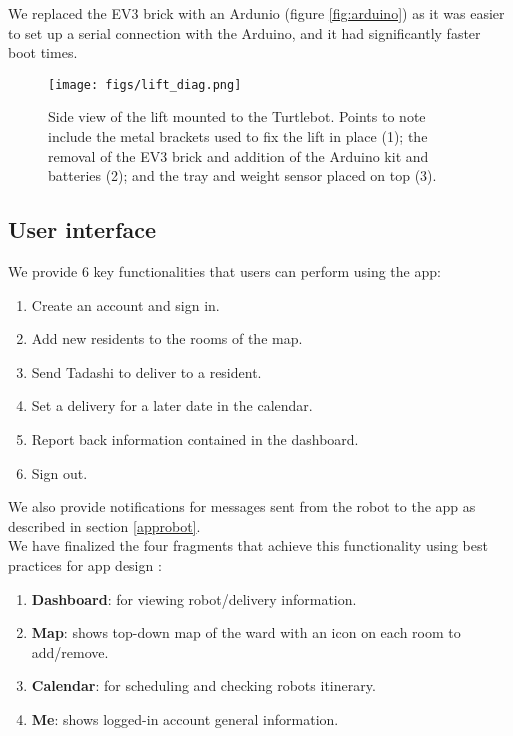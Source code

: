 \documentclass{article}
\begin{document}
We replaced the EV3 brick with an Ardunio (figure \ref{fig:arduino}) as it was easier to set up a serial connection with the Arduino, and it had significantly faster boot times. 


\begin{figure}
  \begin{center}
    \texttt{[image: figs/lift\_diag.png]}
    \caption{Side view of the lift mounted to the Turtlebot. Points to note include the metal brackets used to fix the lift in place (1); the removal of the EV3 brick and addition of the Arduino kit and batteries (2); and the tray and weight sensor placed on top (3).}
  \label{fig:lift}
  \end{center}
\end{figure}

\subsection{User interface}
\label{ui}
We provide 6 key functionalities that users can perform using the app:
\begin{enumerate}
\item Create an account and sign in. 
\item Add new residents to the rooms of the map.
\item Send Tadashi to deliver to a resident. 
\item Set a delivery for a later date in the calendar. 
\item Report back information contained in the dashboard.
\item Sign out.
\end{enumerate}
We also provide notifications for messages sent from the robot to the app as described in section \ref{approbot}.
\\
We have finalized the four fragments that achieve this functionality using best practices for app design \cite{design, ux}:
\begin{enumerate}
  \item {\bf Dashboard}: for viewing robot/delivery information.
  \item {\bf Map}: shows top-down map of the ward with an icon on each room to add/remove. 
  \item {\bf Calendar}: for scheduling and checking robots itinerary.
  \item {\bf Me}: shows logged-in account general information.
\end{enumerate}
\end{document}
